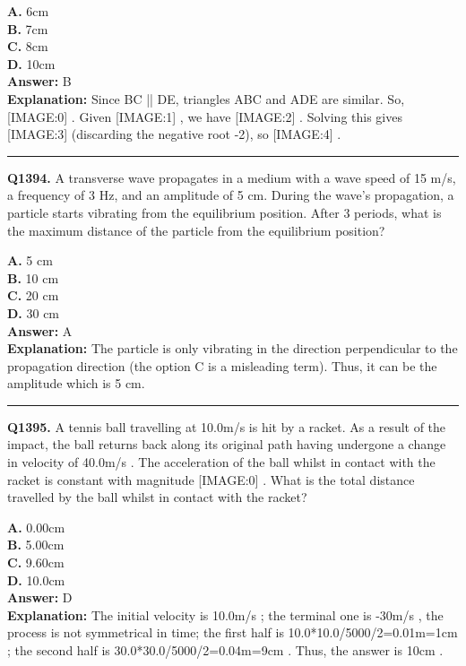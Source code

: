 \documentclass[12pt]{article}
\begin{document}
\textbf{A.} 6cm \\
\textbf{B.} 7cm \\
\textbf{C.} 8cm \\
\textbf{D.} 10cm \\

\textbf{Answer:} B \\
\textbf{Explanation:} Since BC || DE, triangles ABC and ADE are similar.
So,
[IMAGE:0]
.
Given
[IMAGE:1]
, we have
[IMAGE:2]
. Solving this gives
[IMAGE:3]
(discarding the negative root -2), so
[IMAGE:4]
.

\hrule
\vspace{1em}


\noindent
\textbf{Q1394.} A transverse wave propagates in a medium with a wave speed of 15 m/s, a frequency of 3 Hz, and an amplitude of 5 cm. During the wave's propagation, a particle starts vibrating from the equilibrium position. After 3 periods, what is the maximum distance of the particle from the equilibrium position?



\textbf{A.} 5 cm \\
\textbf{B.} 10 cm \\
\textbf{C.} 20 cm \\
\textbf{D.} 30 cm \\

\textbf{Answer:} A \\
\textbf{Explanation:} The particle is only vibrating in the direction perpendicular to the propagation direction (the option C is a misleading term). Thus, it can be the amplitude which is 5 cm.

\hrule
\vspace{1em}


\noindent
\textbf{Q1395.} A tennis ball travelling at 10.0m/s
is hit by a racket. As a result of the impact, the ball returns back along its original path having undergone a change in velocity of 40.0m/s
. The acceleration of the ball whilst in contact with the racket is constant with magnitude
[IMAGE:0]
.
What is the total distance travelled by the ball whilst in contact with the racket?



\textbf{A.} 0.00cm \\
\textbf{B.} 5.00cm \\
\textbf{C.} 9.60cm \\
\textbf{D.} 10.0cm \\

\textbf{Answer:} D \\
\textbf{Explanation:} The initial velocity is 10.0m/s
; the terminal one is -30m/s
, the process is not symmetrical in time; the first half is 10.0*10.0/5000/2=0.01m=1cm
; the second half is 30.0*30.0/5000/2=0.04m=9cm
. Thus, the answer is 10cm
.
\end{document}
